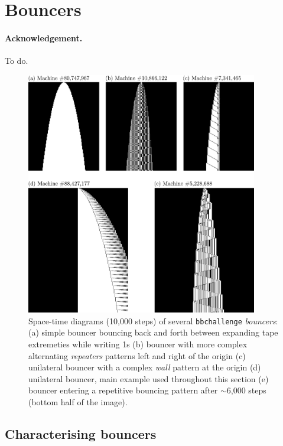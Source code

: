 
\section{Bouncers}\label{sec:bouncers}

\paragraph{Acknowledgement.} To do.


\begin{figure}[h!]
    \centering
    \includegraphics*[width=0.9\textwidth]{figures/bouncers/bouncers.pdf}
    \caption{Space-time diagrams (10,000 steps) of several \texttt{bbchallenge} \textit{bouncers}: (a) simple bouncer bouncing back and forth between expanding tape extremeties while writing 1s (b) bouncer with more complex alternating \textit{repeaters} patterns left and right of the origin (c) unilateral bouncer with a complex \textit{wall} pattern at the origin (d) unilateral bouncer, main example used throughout this section (e) bouncer entering a repetitive bouncing pattern after $\sim$6,000 steps (bottom half of the image).}\label{fig:bouncers}
\end{figure}

\subsection{Characterising bouncers}

